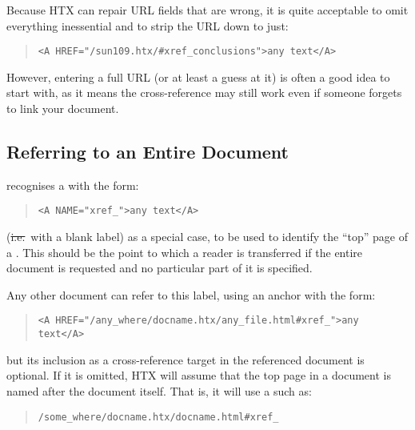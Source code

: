 Because HTX can repair URL fields that are wrong, it is quite
acceptable to omit everything inessential and to strip the URL down to
just:

\begin{quote}
\begin{verbatim}
<A HREF="/sun109.htx/#xref_conclusions">any text</A>
\end{verbatim}
\end{quote}

However, entering a full URL (or at least a guess at it) is often a
good idea to start with, as it means the cross-reference may still
work even if someone forgets to link your document.

\subsection{\label{sect:entiredocuments}Referring to an Entire Document}

 recognises a  with the form:

\begin{quote}
\begin{verbatim}
<A NAME="xref_">any text</A>
\end{verbatim}
\end{quote}

(\st{i.e.}\ with a blank label) as a special case, to be used to
identify the ``top'' page of a . This
should be the point to which a reader is transferred if the entire
document is requested and no particular part of it is specified.

Any other document can refer to this label, using an anchor with the
form:

\begin{quote}
\begin{verbatim}
<A HREF="/any_where/docname.htx/any_file.html#xref_">any text</A>
\end{verbatim}
\end{quote}

but its inclusion as a cross-reference target in the referenced
document is optional. If it is omitted, HTX will assume that the top
 page in a document is named after the document
itself. That is, it will use a  such as:

\begin{quote}
\begin{verbatim}
/some_where/docname.htx/docname.html#xref_
\end{verbatim}
\end{quote}

